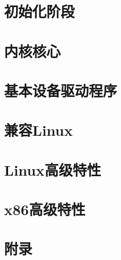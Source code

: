 \documentclass[b5paper,9pt,twoside,openany]{book}
\begin{document}
 

\frontmatter

\setcounter{tocdepth}{3}
\tableofcontents


\mainmatter
\part{初始化阶段}






\part{内核核心}



\part{基本设备驱动程序}







\part{兼容Linux}



\part{Linux高级特性}






\part{x86高级特性}



\part{附录}
\appendix


 
 
 





\backmatter
\end{document}
